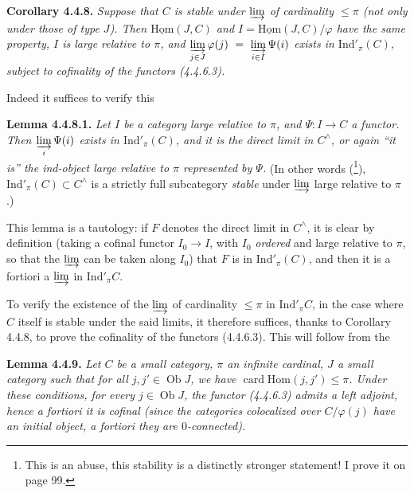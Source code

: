 \documentclass[11pt]{article}
\newcommand{\printedpage}[1]{\marginpar{\footnotesize p.~#1}}
\newcommand{\msp}[1]{\marginpar{\footnotesize [#1]}}
\newcommand{\uHom}{\underline{\mathrm{Hom}}}
\newcommand{\Hom}{\mathrm{Hom}}
\newcommand{\Ind}{\mathrm{Ind}}
\newcommand{\Ob}{\operatorname{Ob}}
\newcommand{\card}{\operatorname{card}}
\begin{document}
\textbf{Corollary 4.4.8.} \textit{Suppose that $C$ is stable under $\varinjlim$ of cardinality $\leqslant \pi$ (not only under those of type $J$). Then $\uHom(J,C)$ and $I = \uHom(J,C)/\varphi$ have the same property, $I$ is large relative to $\pi$, and $\varinjlim\limits_{j\in J} \varphi(j) \ =\ \varinjlim\limits_{i\in I} \Psi(i)$ exists in $\Ind'_\pi(C)$, subject to cofinality of the functors (4.4.6.3).}

\printedpage{21}
Indeed it suffices to verify this

\textbf{Lemma 4.4.8.1.} \textit{Let $I$ be a category large relative to $\pi$, and $\Psi : I \longrightarrow C$ a functor. Then $\varinjlim\limits_{i} \Psi(i)$ exists in $\Ind'_\pi(C)$, and it is the direct limit in $C^\wedge$, or again ``it is'' the ind-object large relative to $\pi$ represented by $\Psi$.} (In other words (\footnote[24]{This is an abuse, this stability is a distinctly stronger statement! I prove it on page 99.}), $\Ind'_\pi(C) \subset C^\wedge$ is a strictly full subcategory \textit{stable} under $\varinjlim$ large relative to $\pi$.)

\msp{page 89}
This lemma is a tautology: if $F$ denotes the direct limit in $C^\wedge$, it is clear by definition (taking a cofinal functor $I_0 \longrightarrow I$, with $I_0$ \textit{ordered} and large relative to $\pi$, so that the $\varinjlim$ can be taken along $I_0$) that $F$ is in $\Ind'_\pi(C)$, and then it is a fortiori a $\varinjlim$ in $\Ind'_\pi C$.

To verify the existence of the $\varinjlim$ of cardinality $\leqslant \pi$ in $\Ind'_\pi C$, in the case where $C$ itself is stable under the said limits, it therefore suffices, thanks to Corollary 4.4.8, to prove the cofinality of the functors (4.4.6.3). This will follow from the

\textbf{Lemma 4.4.9.} \textit{Let $C$ be a small category, $\pi$ an infinite cardinal, $J$ a small category such that for all $j, j' \in \Ob J$, we have $\card \Hom(j,j') \leqslant \pi$. Under these conditions, for every $j \in \Ob J$, the functor (4.4.6.3) \textup{admits a left adjoint,} hence a fortiori it is cofinal (since the categories colocalized over $C/\varphi(j)$ have an initial object, a fortiori they are $0$-connected).}
\end{document}
